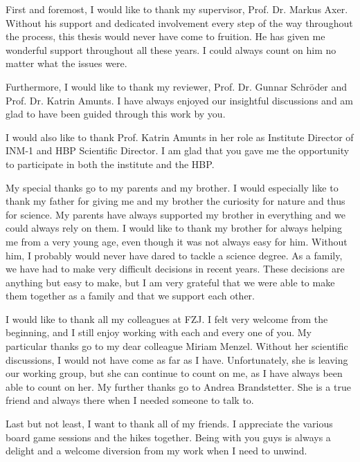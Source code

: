 \label{sec:acknowledgement}
% 
First and foremost, I would like to thank my supervisor, Prof. Dr. Markus Axer.
Without his support and dedicated involvement every step of the way throughout the process, this thesis would never have come to fruition. 
He has given me wonderful support throughout all these years.
I could always count on him no matter what the issues were.

Furthermore, I would like to thank my reviewer, Prof. Dr. Gunnar Schr{\"o}der and Prof. Dr. Katrin Amunts.
I have always enjoyed our insightful discussions and am glad to have been guided through this work by you. 

I would also like to thank Prof. Katrin Amunts in her role as Institute Director of INM-1 and HBP Scientific Director.
I am glad that you gave me the opportunity to participate in both the institute and the HBP.

My special thanks go to my parents and my brother.
I would especially like to thank my father for giving me and my brother the curiosity for nature and thus for science.
My parents have always supported my brother in everything and we could always rely on them.
I would like to thank my brother for always helping me from a very young age, even though it was not always easy for him.
Without him, I probably would never have dared to tackle a science degree.
As a family, we have had to make very difficult decisions in recent years.
These decisions are anything but easy to make, but I am very grateful that we were able to make them together as a family and that we support each other.

I would like to thank all my colleagues at FZJ.
I felt very welcome from the beginning, and I still enjoy working with each and every one of you.
My particular thanks go to my dear colleague Miriam Menzel.
Without her scientific discussions, I would not have come as far as I have.
Unfortunately, she is leaving our working group, but she can continue to count on me, as I have always been able to count on her.
My further thanks go to Andrea Brandstetter.
She is a true friend and always there when I needed someone to talk to.

Last but not least, I want to thank all of my friends.
I appreciate the various board game sessions and the hikes together.
Being with you guys is always a delight and a welcome diversion from my work when I need to unwind. 